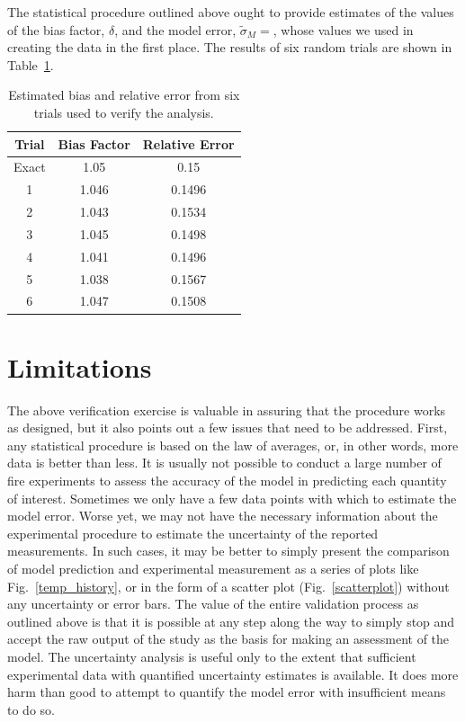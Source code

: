 The statistical procedure outlined above ought to provide estimates of the values of the bias factor, $\delta$, and the model error, $\tilde{\sigma}_M=$, whose
values we used in creating the data in the first place. The results of six random trials are shown in Table~\ref{trials}.
\begin{table}[ht!]
\caption{Estimated bias and relative error from six trials used to verify the analysis. }
\begin{center}
\begin{tabular}{|c|c|c|}
\hline
Trial   & Bias Factor      & Relative Error \\ \hline \hline
Exact   & 1.05             &    0.15            \\ \hline \hline
1       & 1.046            &    0.1496            \\ \hline
2       & 1.043            &    0.1534            \\ \hline
3       & 1.045            &    0.1498            \\ \hline
4       & 1.041            &    0.1496            \\ \hline
5       & 1.038            &    0.1567            \\ \hline
6       & 1.047            &    0.1508            \\ \hline
\end{tabular}
\end{center}
\label{trials}
\end{table}



\section{Limitations}

The above verification exercise is valuable in assuring that the procedure works as designed, but it also points out a few issues that need to be addressed. First, any
statistical procedure is based on the law of averages, or, in other words, more data is better than less. It is usually not possible to conduct a large number of
fire experiments
to assess the accuracy of the model in predicting each quantity of interest. Sometimes we only have a few data points with which to estimate the model error. Worse yet,
we may not have the necessary information about the experimental procedure to estimate the uncertainty of the reported measurements. In such cases, it may be better
to simply present the comparison of model prediction and experimental measurement as a series of plots like Fig.~\ref{temp_history}, or in the form of a scatter plot
(Fig.~\ref{scatterplot}) without any uncertainty or error bars. The value of the entire validation process as outlined above is that it is possible at any step
along the way to simply stop and accept the raw output of the study as the basis for making an assessment of the model. The uncertainty analysis is useful only to
the extent that sufficient experimental data with quantified uncertainty estimates is available. It does more harm than good to attempt to quantify the model error
with insufficient means to do so.

